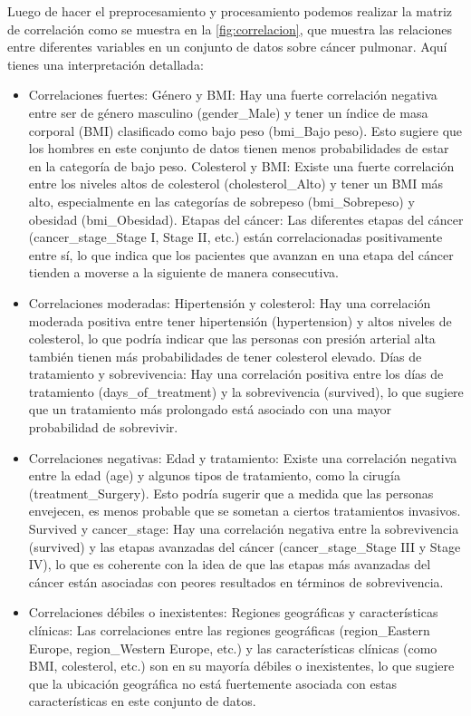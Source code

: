 \documentclass[10pt,journal,compsoc]{IEEEtran}
\begin{document}
Luego de hacer el preprocesamiento y procesamiento podemos realizar la matriz de  correlación como se muestra en la \autoref{fig:correlacion},   que muestra las relaciones entre diferentes variables en un conjunto de datos sobre cáncer pulmonar. Aquí tienes una interpretación detallada: 
\begin{itemize}
  \item Correlaciones fuertes:
Género y BMI: Hay una fuerte correlación negativa entre ser de género masculino (gender\_Male) y tener un índice de masa corporal (BMI) clasificado como bajo peso (bmi\_Bajo peso). Esto sugiere que los hombres en este conjunto de datos tienen menos probabilidades de estar en la categoría de bajo peso.
Colesterol y BMI: Existe una fuerte correlación entre los niveles altos de colesterol (cholesterol\_Alto) y tener un BMI más alto, especialmente en las categorías de sobrepeso (bmi\_Sobrepeso) y obesidad (bmi\_Obesidad).
Etapas del cáncer: Las diferentes etapas del cáncer (cancer\_stage\_Stage I, Stage II, etc.) están correlacionadas positivamente entre sí, lo que indica que los pacientes que avanzan en una etapa del cáncer tienden a moverse a la siguiente de manera consecutiva.
  \item Correlaciones moderadas:
Hipertensión y colesterol: Hay una correlación moderada positiva entre tener hipertensión (hypertension) y altos niveles de colesterol, lo que podría indicar que las personas con presión arterial alta también tienen más probabilidades de tener colesterol elevado.
Días de tratamiento y sobrevivencia: Hay una correlación positiva entre los días de tratamiento (days\_of\_treatment) y la sobrevivencia (survived), lo que sugiere que un tratamiento más prolongado está asociado con una mayor probabilidad de sobrevivir.
  \item Correlaciones negativas:
Edad y tratamiento: Existe una correlación negativa entre la edad (age) y algunos tipos de tratamiento, como la cirugía (treatment\_Surgery). Esto podría sugerir que a medida que las personas envejecen, es menos probable que se sometan a ciertos tratamientos invasivos.
Survived y cancer\_stage: Hay una correlación negativa entre la sobrevivencia (survived) y las etapas avanzadas del cáncer (cancer\_stage\_Stage III y Stage IV), lo que es coherente con la idea de que las etapas más avanzadas del cáncer están asociadas con peores resultados en términos de sobrevivencia.
  \item Correlaciones débiles o inexistentes:
Regiones geográficas y características clínicas: Las correlaciones entre las regiones geográficas (region\_Eastern Europe, region\_Western Europe, etc.) y las características clínicas (como BMI, colesterol, etc.) son en su mayoría débiles o inexistentes, lo que sugiere que la ubicación geográfica no está fuertemente asociada con estas características en este conjunto de datos.

\end{itemize}
 
\end{document}
